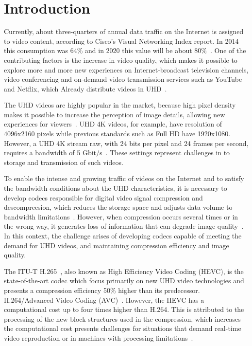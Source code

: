\documentclass{acm_proc_article-sp}
\begin{document}

\section{Introduction}

Currently, about three-quarters of annual data traffic on the Internet is assigned to video content, according to Cisco's Visual Networking Index report. In 2014 this consumption was 64\% and in 2020 this value will be about 80\%~\cite{Cisco:16}. One of the contributing factors is the increase in video quality, which makes it possible to explore more and more new experiences on Internet-broadcast television channels, video conferencing and on-demand video transmission services such as YouTube and Netflix, which Already distribute videos in UHD~\cite{cheon:14}.

The UHD videos are highly popular in the market, because high pixel density makes it possible to increase the perception of image details, allowing new experiences for viewers~\cite{cheon:14}. UHD 4K videos, for example, have resolution of 4096x2160 pixels while previous standards such as Full HD have 1920x1080. However, a UHD 4K stream raw, with 24 bits per pixel and 24 frames per second, requires a bandwidth of 5 Gbit/s~\cite{gomes:13}. These settings represent challenges in to storage and transmission of such videos.

To enable the intense and growing traffic of videos on the Internet and to satisfy the bandwidth conditions about the UHD characteristics, it is necessary to develop codecs responsible for digital video signal compression and descompreesion, which reduces the storage space and adjusts data volume to bandwidth limitations~\cite{oliveira:16}\cite{wang:13}. However, when compression occurs several times or in the wrong way, it generates loss of information that can degrade image quality~\cite{netflix:16}. In this context, the challenge arises of developing codecs capable of meeting the demand for UHD videos, and maintaining compression efficiency and image quality.

The ITU-T H.265~\cite{itu:265}, also known as High Efficiency Video Coding (HEVC), is the state-of-the-art codec which focus primarily on new UHD video technologies and presents a compression efficiency 50\% higher than its predecessor. H.264/Advanced Video Coding (AVC)~\cite{Bossen:12}\cite{Hanhart:12}\cite{Sullivan:12}. However, the HEVC has a computational cost up to four times higher than H.264. This is attributed to the processing of the new block structures used in the compression, which increases the computational cost presents challenges for situations that demand real-time video reproduction or in machines with processing limitations~\cite{Yoon:13}\cite{Correa:12}.
\end{document}
